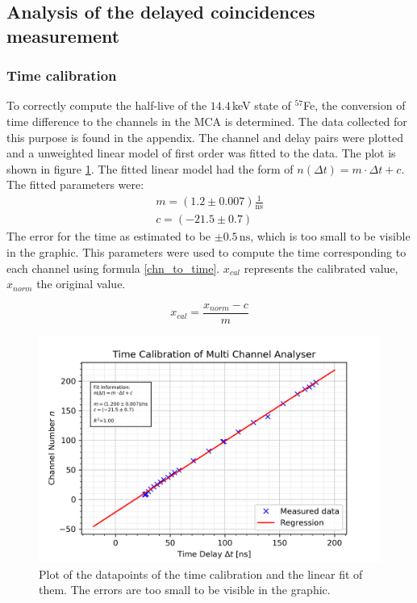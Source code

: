 \documentclass[30pt,a4paper]{article}
\begin{document}
 	\subsection{Analysis of the delayed coincidences measurement}
 	\subsubsection{Time calibration}
 	To correctly compute the half-live of the $14.4$\,keV state of $^{57}$Fe, the conversion of time difference to the channels in the MCA is determined.
 	The data collected for this purpose is found in the appendix. 
 	The channel and delay pairs were plotted and a unweighted linear model of first
 	order was fitted to the data. The plot is shown in figure \ref{time_cal_plot}.
 	The fitted linear model had the form of $n(\Delta t) = m \cdot \Delta t + c$.
 	The fitted parameters were:
	\begin{eqnarray}
 	m = (1.2 \pm 0.007)\frac{1}{\textrm{ns}} \\
 	c = (-21.5 \pm 0.7)
 	\end{eqnarray}
 	The error for the time as estimated to be $\pm 0.5\,\textrm{ns}$, which is too small
 	to be visible in the graphic.
 	This parameters were used to compute the time corresponding to each channel using 
 	formula \ref{chn_to_time}. $x_{cal}$ represents the calibrated value, $x_{norm}$ the
 	original value.
 	
 	\begin{equation}
 	x_{cal} = \frac{x_{norm}-c}{m}
 	\label{chn_to_time}
 	\end{equation}
 	
 	\begin{figure}[h]
 		\includegraphics{Bilder/time_cal}
 		\centering
 		\caption{\small Plot of the datapoints of the time calibration and the linear fit of them. The errors are too small to be visible in the graphic.}
 		\label{time_cal_plot}
 	\end{figure}
 	
\end{document}
